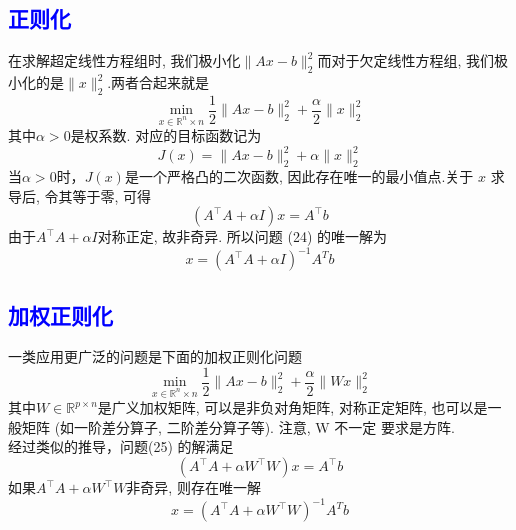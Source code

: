 \documentclass[12pt,a4paper]{article}
\begin{document}
\subsection{\textcolor{blue}{正则化}}
在求解超定线性方程组时, 我们极小化$\|A x-b\|_{2}^{2}$而对于欠定线性方程组, 我们极小化的是$\|x\|_{2}^{2}$.两者合起来就是
\begin{equation}
\min _{x \in \mathbb{R}^{n} \times n} \frac{1}{2}\|A x-b\|_{2}^{2}+\frac{\alpha}{2}\|x\|_{2}^{2}
\end{equation}
其中$\alpha>0$是权系数. 对应的目标函数记为
$$
J(x)=\|A x-b\|_{2}^{2}+\alpha\|x\|_{2}^{2}
$$
当$\alpha>0$时，$J(x)$是一个严格凸的二次函数, 因此存在唯一的最小值点.关于 $x$ 求导后, 令其等于零, 可得
$$
\left(A^{\top} A+\alpha I\right) x=A^{\top} b
$$
由于$A^{\top} A+\alpha I$对称正定, 故非奇异. 所以问题 (24) 的唯一解为
$$
x=\left(A^{\top} A+\alpha I\right)^{-1} A^{T} b
$$
\subsection{\textcolor{blue}{加权正则化}}
一类应用更广泛的问题是下面的加权正则化问题
\begin{equation}
\min _{x \in \mathbb{R}^{n} \times n} \frac{1}{2}\|A x-b\|_{2}^{2}+\frac{\alpha}{2}\|W x\|_{2}^{2}
\end{equation}
其中$W \in \mathbb{R}^{p \times n}$是广义加权矩阵, 可以是非负对角矩阵, 对称正定矩阵, 也可以是一般矩阵 (如一阶差分算子, 二阶差分算子等). 注意, W 不一定 要求是方阵.\\
经过类似的推导，问题(25) 的解满足
$$
\left(A^{\top} A+\alpha W^{\top} W\right) x=A^{\top} b
$$
如果$A^{\top} A+\alpha W^{\top} W$非奇异, 则存在唯一解
$$
x=\left(A^{\top} A+\alpha W^{\top} W\right)^{-1} A^{T} b
$$
\end{document}
